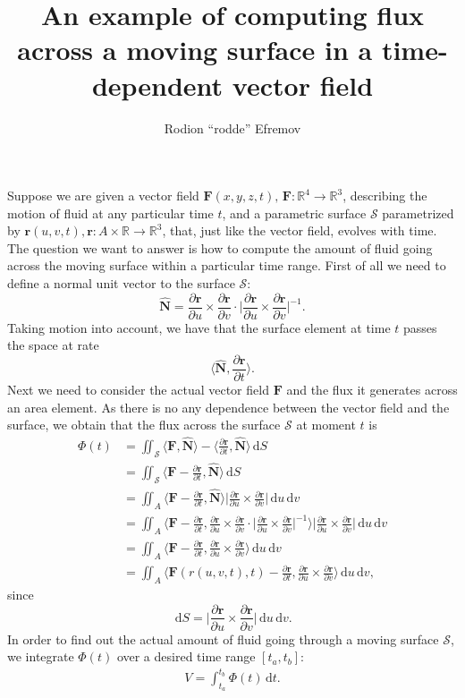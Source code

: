 \documentclass[10pt]{article}
\title{An example of computing flux across a moving surface in a time-dependent vector field}
\author{Rodion ``rodde'' Efremov}
\newcommand{\F}{\mathbf{F}}
\newcommand{\surf}{\mathbf{r}}
\newcommand{\N}{\hat{\mathbf{N}}}
\newcommand{\R}{\mathbb{R}}
\newcommand{\dr}{\partial \surf}
\newcommand{\du}{\partial u}
\newcommand{\dv}{\partial v}
\newcommand{\dt}{\partial t}
\newcommand{\dru}{\frac{\dr}{\du}}
\newcommand{\drv}{\frac{\dr}{\dv}}
\newcommand{\drt}{\frac{\dr}{\dt}}
\newcommand{\dS}{\,\mathrm{d}S}
\newcommand{\ddt}{\,\mathrm{d}t}
\newcommand{\ddu}{\, \mathrm{d}u}
\newcommand{\ddv}{\, \mathrm{d}v}
\begin{document}
 \maketitle

\noindent Suppose we are given a vector field $\F(x, y, z, t), \, \F \colon \R^4 \to \R^3$, describing the motion of fluid at any particular time $t$, and a parametric surface $\mathscr{S}$ parametrized by $\surf (u, v, t), \surf \colon A \times \R \to \R^3$, that, just like the vector field, evolves with time. The question we want to answer is how to compute the amount of fluid going across the moving surface within a particular time range. First of all we need to define a normal unit vector to the surface $\mathscr{S}$:
\[
\N = \dru \times \drv \cdot \Bigg| \dru \times \drv \Bigg|^{-1}.
\]
Taking motion into account, we have that the surface element at time $t$ passes the space at rate 
\[
\Big\langle \N , \drt \Big\rangle.
\]
Next we need to consider the actual vector field $\F$ and the flux it generates across an area element. As there is no any dependence between the vector field and the surface, we obtain that the flux across the surface $\mathscr{S}$ at moment $t$ is
\begin{align*}
\Phi(t) &= \iint_{\mathscr{S}} \langle \F, \N \rangle - \langle \drt, \N \rangle \dS \\
		   &= \iint_{\mathscr{S}} \langle \F - \drt, \N \rangle \dS \\
		   &= \iint_A \langle \F - \drt, \N \rangle \Bigg| \dru \times \drv \Bigg| \ddu \ddv \\ 
		   &= \iint_A \Bigg\langle \F - \drt, \dru \times \drv \cdot \Bigg| \dru \times \drv \Bigg|^{-1} \Bigg\rangle \Bigg| \dru \times \drv \Bigg| \ddu \ddv \\ 
		   &= \iint_A \Bigg\langle \F - \drt, \dru \times \drv \Bigg\rangle \ddu \ddv \\
		   &= \iint_A \Bigg\langle \F(r(u, v, t), t) - \drt, \dru \times \drv \Bigg\rangle \ddu \ddv,
\end{align*}
since
\[
\dS = \Bigg| \dru \times \drv \Bigg| \ddu \ddv.
\]
In order to find out the actual amount of fluid going through a moving surface $\mathscr{S}$, we integrate $\Phi(t)$ over a desired time range $\left[ t_a, t_b \right]$:
\begin{align*}
V = \int_{t_a}^{t_b} \Phi(t) \ddt.
\end{align*}
\end{document}
